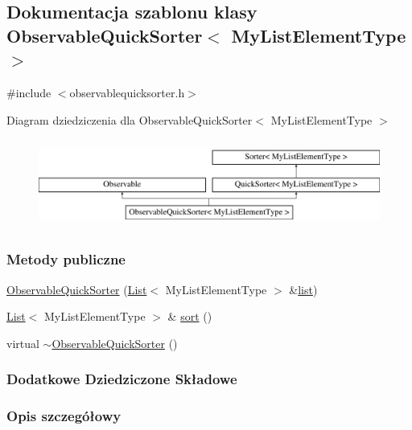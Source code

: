 \hypertarget{class_observable_quick_sorter}{\subsection{Dokumentacja szablonu klasy Observable\-Quick\-Sorter$<$ My\-List\-Element\-Type $>$}
\label{class_observable_quick_sorter}
}


{\ttfamily \#include $<$observablequicksorter.\-h$>$}

Diagram dziedziczenia dla Observable\-Quick\-Sorter$<$ My\-List\-Element\-Type $>$\begin{figure}[H]
\begin{center}
\leavevmode
\includegraphics[height=2.926829cm]{class_observable_quick_sorter}
\end{center}
\end{figure}
\subsubsection*{Metody publiczne}
\begin{DoxyCompactItemize}
\item 
\hyperlink{class_observable_quick_sorter_a217751e25c07354b33d9e417bcc4f0c4}{Observable\-Quick\-Sorter} (\hyperlink{class_list}{List}$<$ My\-List\-Element\-Type $>$ \&\hyperlink{class_quick_sorter_a60a7a4772c958f256962294418e83fe4}{list})
\item 
\hyperlink{class_list}{List}$<$ My\-List\-Element\-Type $>$ \& \hyperlink{class_observable_quick_sorter_aa32fd1f6c024b3993c4d43302d0702f3}{sort} ()
\item 
virtual \hyperlink{class_observable_quick_sorter_a346874659e31256462d9cf8caab53a6e}{$\sim$\-Observable\-Quick\-Sorter} ()
\end{DoxyCompactItemize}
\subsubsection*{Dodatkowe Dziedziczone Składowe}


\subsubsection{Opis szczegółowy}

